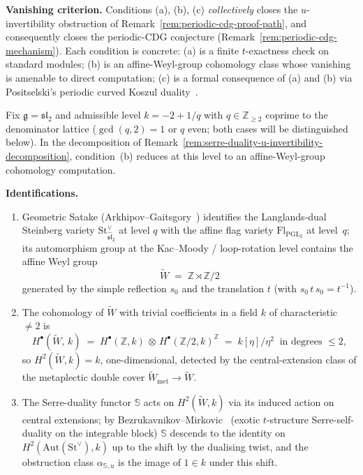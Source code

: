 \begin{remark}
\medskip
\noindent\textbf{Vanishing criterion.} Conditions (a), (b), (c)
\emph{collectively} closes the $u$-invertibility obstruction of
Remark~\textup{\ref{rem:periodic-cdg-proof-path}}, and consequently
closes the periodic-CDG conjecture (Remark~\ref{rem:periodic-cdg-mechanism}). Each condition is concrete:
(a) is a finite $t$-exactness check on standard modules;
(b) is an affine-Weyl-group cohomology class whose vanishing is
amenable to direct computation; (c) is a formal consequence of
(a) and (b) via Positselski's periodic curved Koszul
duality~\cite{Positselski11,Positselski18}.
\end{remark}

\begin{proposition}
\label{prop:alpha-su-sl2-admissible}
%
%
%
Fix $\mathfrak{g} = \mathfrak{sl}_2$ and admissible level
$k = -2 + 1/q$ with $q \in \mathbb{Z}_{\geq 2}$ coprime to the
denominator lattice ($\gcd(q,2) = 1$ or $q$ even; both cases will be
distinguished below). In the decomposition of
Remark~\textup{\ref{rem:serre-duality-u-invertibility-decomposition}},
condition~\textup{(b)} reduces at this level to an affine-Weyl-group
cohomology computation.

\medskip
\noindent\textbf{Identifications.}
\begin{enumerate}[label=\textup{(\roman*)}]
\item Geometric Satake
(Arkhipov--Gaitsgory~\cite{ArkhipovGaitsgory09}) identifies the
Langlands-dual Steinberg variety
$\mathrm{St}^{\vee}_{\widehat{\mathfrak{sl}}_2}$ at level $q$ with the
affine flag variety $\mathrm{Fl}_{\mathrm{PGL}_2}$ at level~$q$; its
automorphism group at the
Kac--Moody / loop-rotation level contains the affine Weyl group
\[
\widetilde{W} \;=\; \mathbb{Z}\rtimes\mathbb{Z}/2
\]
generated by the simple reflection $s_0$ and the translation $t$
(with $s_0\, t\, s_0 = t^{-1}$).
\item The cohomology of $\widetilde{W}$ with trivial coefficients in
a field $k$ of characteristic $\neq 2$ is
\[
H^\bullet(\widetilde{W},\,k) \;=\;
H^\bullet(\mathbb{Z},k)\,\otimes\,H^\bullet(\mathbb{Z}/2,k)^{\mathbb{Z}}
\;=\; k[\eta]/\eta^2\ \text{ in degrees }\le 2,
\]
so $H^2(\widetilde{W},k) = k$, one-dimensional, detected by the
central-extension class of the metaplectic double cover
$\widetilde{W}_{\mathrm{met}} \to \widetilde{W}$.
\item The Serre-duality functor $\mathbb{S}$ acts on
$H^2(\widetilde{W},k)$ via its induced action on central extensions;
by Bezrukavnikov--Mirkovic~\cite{Bezrukavnikov16} (exotic
$t$-structure Serre-self-duality on the integrable block)
$\mathbb{S}$ descends to the identity on
$H^2(\mathrm{Aut}(\mathrm{St}^{\vee}),k)$ up to the shift by the
dualising twist, and the obstruction class $\alpha_{\mathbb{S},u}$
is the image of $1\in k$ under this shift.
\end{enumerate}


\end{proposition}
